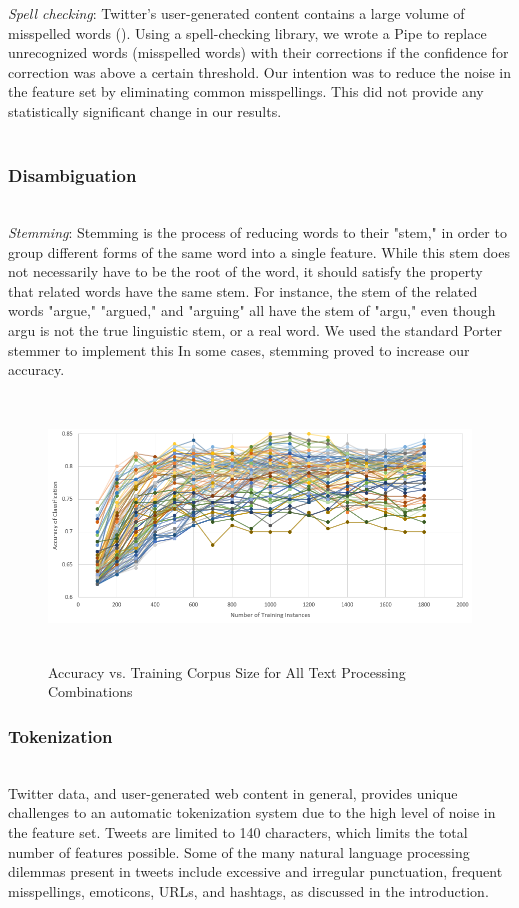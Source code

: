 \documentclass[letterpaper]{article}
\begin{document}
\textit{Spell checking}: Twitter's user-generated content contains a large volume of misspelled words (\citeauthor{Laboreiro:2010:TMM:1871840.1871853}). Using a spell-checking library, we wrote a Pipe to replace unrecognized words (misspelled words) with their corrections if the confidence for correction was above a certain threshold. Our intention was to reduce the noise in the feature set by eliminating common misspellings. This did not provide any statistically significant change in our results. \\
~\\
\subsubsection{Disambiguation}
~\\
\textit{Stemming}: Stemming is the process of reducing words to their "stem," in order to group different forms of the same word into a single feature. While this stem does not necessarily have to be the root of the word, it should satisfy the property that related words have the same stem. For instance, the stem of the related words "argue," "argued," and "arguing" all have the stem of "argu," even though argu is not the true linguistic stem, or a real word. We used the standard Porter stemmer to implement this%
In some cases, stemming proved to increase our accuracy.
\\

\begin{figure}[t!]
\centering
\includegraphics[height=7cm]{chart}
\caption{Accuracy vs. Training Corpus Size for All Text Processing Combinations}
\label{fig:chart}
\end{figure}

\subsubsection{Tokenization}
~\\
Twitter data, and user-generated web content in general, provides unique challenges to an automatic tokenization system due to the high level of noise in the feature set. Tweets are limited to 140 characters, which limits the total number of features possible. Some of the many natural language processing dilemmas present in tweets include excessive and irregular punctuation, frequent misspellings, emoticons, URLs, and hashtags, as discussed in the introduction.\\
\end{document}
